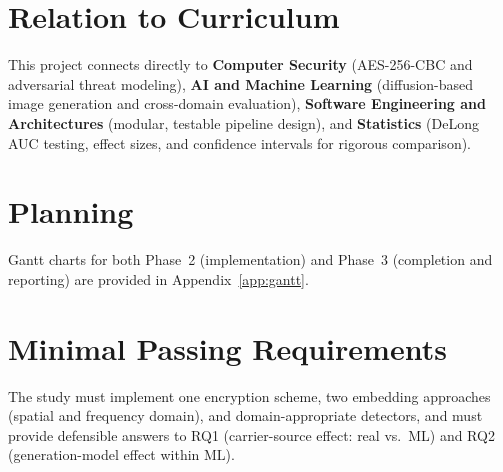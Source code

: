 \documentclass[10pt,twocolumn,a4paper]{article}
\begin{document}
\section{Relation to Curriculum}

This project connects directly to \textbf{Computer Security} (AES-256-CBC and adversarial threat modeling), \textbf{AI and Machine Learning} (diffusion-based image generation and cross-domain evaluation), \textbf{Software Engineering and Architectures} (modular, testable pipeline design), and \textbf{Statistics} (DeLong AUC testing, effect sizes, and confidence intervals for rigorous comparison).

\section{Planning}

Gantt charts for both Phase~2 (implementation) and Phase~3 (completion and reporting) are provided in Appendix~\ref{app:gantt}.

\section{Minimal Passing Requirements}

The study must implement one encryption scheme, two embedding approaches (spatial and frequency domain), and domain-appropriate detectors, and must provide defensible answers to RQ1 (carrier-source effect: real vs.\ ML) and RQ2 (generation-model effect within ML).

\clearpage
\renewcommand{\refname}{References}
\end{document}
